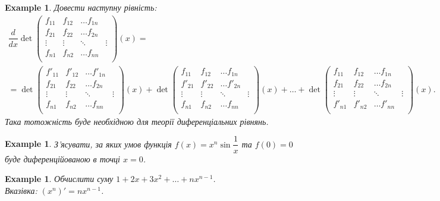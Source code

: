 \documentclass[a4paper, 14pt]{article}
\theoremstyle{theoremdd}
\theoremstyle{theoremdd}
\theoremstyle{theoremdd}
\theoremstyle{theoremdd}
\newtheorem{example}[theorem]{Example}
\theoremstyle{theoremdd}
\theoremstyle{theoremdd}
\theoremstyle{theoremdd}
\theoremstyle{theoremdd}
\theoremstyle{theoremdd}
\begin{document}
\begin{example}
Довести наступну рівність:
\begin{align*}
\dfrac{d}{dx} \det \begin{pmatrix}
f_{11} & f_{12} & \dots f_{1n} \\
f_{21} & f_{22} & \dots f_{2n} \\
\vdots & \vdots & \ddots & \vdots \\
f_{n1} & f_{n2} & \dots f_{nn} \\
\end{pmatrix}(x) = \\
= \det \begin{pmatrix}
f'_{11} & f'_{12} & \dots f'_{1n} \\
f_{21} & f_{22} & \dots f_{2n} \\
\vdots & \vdots & \ddots & \vdots \\
f_{n1} & f_{n2} & \dots f_{nn} \\
\end{pmatrix}(x) + \det \begin{pmatrix}
f_{11} & f_{12} & \dots f_{1n} \\
f'_{21} & f'_{22} & \dots f'_{2n} \\
\vdots & \vdots & \ddots & \vdots \\
f_{n1} & f_{n2} & \dots f_{nn} \\
\end{pmatrix}(x) + \dots + \det \begin{pmatrix}
f_{11} & f_{12} & \dots f_{1n} \\
f_{21} & f_{22} & \dots f_{2n} \\
\vdots & \vdots & \ddots & \vdots \\
f'_{n1} & f'_{n2} & \dots f'_{nn} \\
\end{pmatrix}(x). 
\end{align*}
Така тотожність буде необхідною для теорії диференціальних рівнянь.
\end{example}

\begin{example}
З'ясувати, за яких умов функція $f(x) = x^n \sin \dfrac{1}{x}$ та $f(0) = 0$ буде диференційованою в точці $x = 0$. 
\end{example}

\begin{example}
Обчислити суму $1 + 2x + 3x^2 + \dots + nx^{n-1}$.\\
\textit{Вказівка: $(x^n)' = n x^{n-1}$.}
\end{example}
\end{document}
